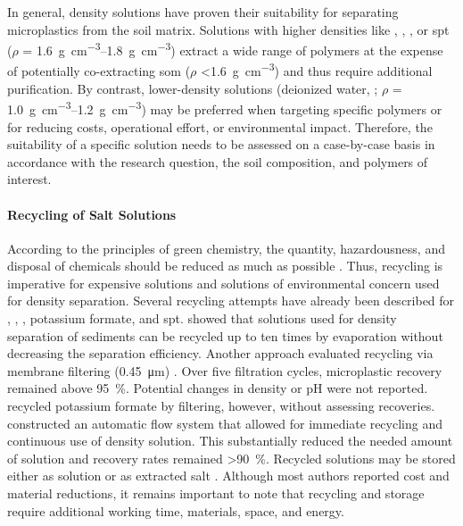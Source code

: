 In general, density solutions have proven their suitability for separating microplastics from the soil matrix. Solutions with higher densities like , , , or \ac{spt} ($\rho$ =
\SIrange{1.6}{1.8}{\gram\per\cubic\centi\meter}) extract a wide range of polymers at the expense of potentially co-extracting \ac{som} ($\rho$
\SI{<1.6}{\gram\per\cubic\centi\meter}) \citep{CerliSeparation2012} and thus require additional purification. By contrast, lower-density solutions (deionized water, ; $\rho$ = \SIrange{1.0}{1.2}{\gram\per\cubic\centi\meter}) may be preferred when targeting specific polymers or for reducing costs, operational effort, or environmental impact. Therefore, the suitability of a specific solution needs to be assessed on a case-by-case basis in accordance with the research question, the soil composition, and polymers of interest.

\paragraph{Recycling of Salt Solutions}

According to the principles of green chemistry, the quantity,
hazardousness, and disposal of chemicals should be reduced as much as possible \citep{AnastasGreen2009}. Thus, recycling is imperative
for expensive solutions and solutions of environmental concern used for density separation. Several recycling attempts have already been described for , , , potassium formate, and \ac{spt}. \citet{KedzierskiEfficient2017} showed that  solutions used for density separation of sediments can be recycled up to ten times by evaporation without decreasing the separation efficiency. Another approach evaluated  recycling via membrane filtering (\SI{0.45}{\micro\meter}) \citep{RodriguesImproving2020}. Over five filtration cycles,
microplastic recovery remained above \SI{95}{\percent}. Potential changes in density or pH were not reported. \citet{StockSampling2019} recycled potassium formate by filtering, however, without assessing recoveries. \citet{LiuMethod2019} constructed an automatic flow system that allowed for immediate recycling and continuous use of density solution.
This substantially reduced the needed amount of  solution and recovery rates remained \SI{>90}{\percent}. Recycled solutions may be stored either as solution \citep{LiuMethod2019,RodriguesImproving2020} or as extracted salt \citep{KedzierskiEfficient2017}. Although most authors reported cost and material reductions, it remains important to note that recycling and storage require additional working time, materials, space, and energy.

